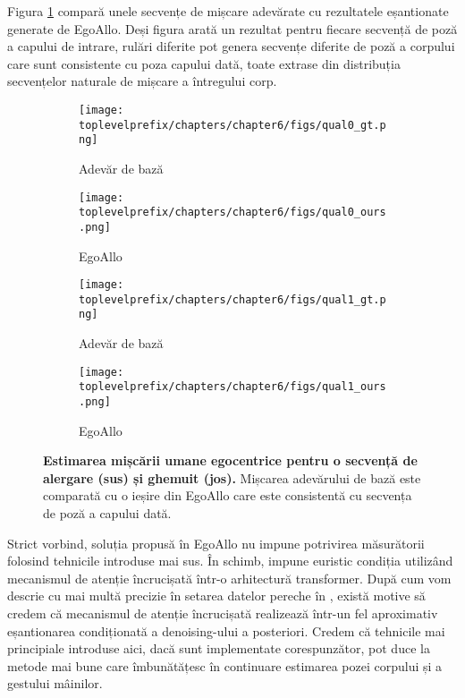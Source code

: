 \documentclass[../../book-main_ro.tex]{subfiles}
\begin{document}
Figura \ref{fig:comparison} compară unele secvențe de mișcare adevărate cu rezultatele eșantionate generate de EgoAllo. Deși figura arată un rezultat pentru fiecare secvență de poză a capului de intrare, rulări diferite pot genera secvențe diferite de poză a corpului care sunt consistente cu poza capului dată, toate extrase din distribuția secvențelor naturale de mișcare a întregului corp.
\begin{figure}[t]
\centering
\begin{subfigure}{0.45\textwidth}
  \centering
  \texttt{[image: \\toplevelprefix/chapters/chapter6/figs/qual0\_gt.png]}
  \caption{\centering Adevăr de bază}
\end{subfigure}
\hfill
\begin{subfigure}{0.45\textwidth}
  \centering
  \texttt{[image: \\toplevelprefix/chapters/chapter6/figs/qual0\_ours.png]}
  \caption{EgoAllo}
\end{subfigure}

\begin{subfigure}{0.45\textwidth}
  \centering
  \texttt{[image: \\toplevelprefix/chapters/chapter6/figs/qual1\_gt.png]}
  \caption{\centering Adevăr de bază}
\end{subfigure}
\hfill
\begin{subfigure}{0.45\textwidth}
  \centering
  \texttt{[image: \\toplevelprefix/chapters/chapter6/figs/qual1\_ours.png]}
  \caption{EgoAllo}
\end{subfigure}

\caption{
\textbf{Estimarea mișcării umane egocentrice pentru o secvență de alergare (sus) și ghemuit (jos).}
Mișcarea adevărului de bază este comparată cu o ieșire din EgoAllo care este consistentă cu secvența de poză a capului dată. 
}
\label{fig:comparison}
\end{figure}

Strict vorbind, soluția propusă în EgoAllo \cite{yi2024egoallo} nu
impune potrivirea măsurătorii folosind tehnicile introduse mai sus. În schimb,
impune euristic condiția utilizând mecanismul de atenție încrucișată
într-o arhitectură transformer. După cum vom descrie cu mai multă precizie
în setarea datelor pereche în , există motive să credem că mecanismul
de atenție încrucișată realizează într-un fel aproximativ eșantionarea condiționată
a denoising-ului a posteriori. Credem că tehnicile mai principiale
introduse aici, dacă sunt implementate corespunzător, pot duce la metode mai bune
care îmbunătățesc în continuare estimarea pozei corpului și a gestului mâinilor.
\end{document}
